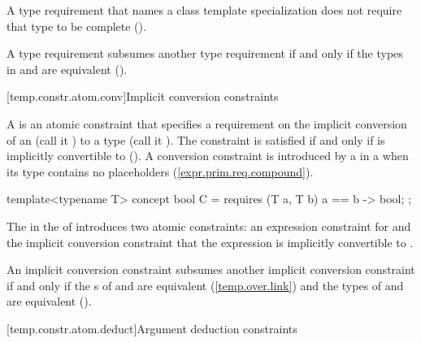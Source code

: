 \pnum
A type requirement that names a class template specialization 
does not require that type to be complete 
(). 

\pnum
A type requirement  subsumes another type
requirement  if and only if the types in 
and  are equivalent 
(). 


[temp.constr.atom.conv]{Implicit conversion constraints}

\pnum
A  is an atomic
constraint that specifies a requirement 
on the implicit conversion of an 
(call it ) to a 
type (call it ). The constraint is satisfied if and 
only if  is implicitly convertible to 
().
% 
\enternote
A conversion constraint is introduced by a
 in a
 when
its type contains no placeholders
(\ref{expr.prim.req.compound}).
\exitnote
% 
\enterexample
\begin{codeblock}
template<typename T> concept bool C = 
  requires (T a, T b) {
    { a == b } -> bool;
  };
\end{codeblock}
The  in the
 of 
introduces two atomic constraints: an expression constraint
for  and the implicit conversion constraint that 
the expression  is implicitly convertible to
.
\exitexample
          
\pnum
An implicit conversion constraint  subsumes 
another implicit conversion constraint  if and only if
the s of 
 and  are equivalent
(\ref{temp.over.link}) and the types
of  and  are equivalent
().


[temp.constr.atom.deduct]{Argument deduction constraints}

